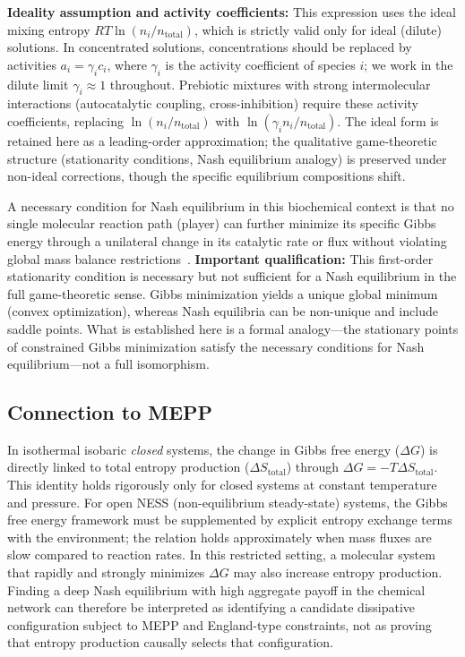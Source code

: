 \documentclass[12pt,a4paper]{article}
\theoremstyle{remark}
\begin{document}
\noindent
\textbf{Ideality assumption and activity coefficients:} This expression uses the ideal mixing entropy $RT\ln(n_i/n_{\mathrm{total}})$, which is strictly valid only for ideal (dilute) solutions. In concentrated solutions, concentrations should be replaced by activities $a_i = \gamma_i c_i$, where $\gamma_i$ is the activity coefficient of species $i$; we work in the dilute limit $\gamma_i \approx 1$ throughout. Prebiotic mixtures with strong intermolecular interactions (autocatalytic coupling, cross-inhibition) require these activity coefficients, replacing $\ln(n_i/n_{\mathrm{total}})$ with $\ln(\gamma_i n_i/n_{\mathrm{total}})$. The ideal form is retained here as a leading-order approximation; the qualitative game-theoretic structure (stationarity conditions, Nash equilibrium analogy) is preserved under non-ideal corrections, though the specific equilibrium compositions shift.

A necessary condition for Nash equilibrium in this biochemical context is that no single molecular reaction path (player) can further minimize its specific Gibbs energy through a unilateral change in its catalytic rate or flux without violating global mass balance restrictions~\citep{MetabolicNash}. \textbf{Important qualification:} This first-order stationarity condition is necessary but not sufficient for a Nash equilibrium in the full game-theoretic sense. Gibbs minimization yields a unique global minimum (convex optimization), whereas Nash equilibria can be non-unique and include saddle points. What is established here is a formal analogy---the stationary points of constrained Gibbs minimization satisfy the necessary conditions for Nash equilibrium---not a full isomorphism.

\subsection{Connection to MEPP}

In isothermal isobaric \emph{closed} systems, the change in Gibbs free energy ($\Delta G$) is directly linked to total entropy production ($\Delta S_{\mathrm{total}}$) through $\Delta G = -T\Delta S_{\mathrm{total}}$. This identity holds rigorously only for closed systems at constant temperature and pressure. For open NESS (non-equilibrium steady-state) systems, the Gibbs free energy framework must be supplemented by explicit entropy exchange terms with the environment; the relation holds approximately when mass fluxes are slow compared to reaction rates. In this restricted setting, a molecular system that rapidly and strongly minimizes $\Delta G$ may also increase entropy production. Finding a deep Nash equilibrium with high aggregate payoff in the chemical network can therefore be interpreted as identifying a candidate dissipative configuration subject to MEPP and England-type constraints, not as proving that entropy production causally selects that configuration.
\end{document}

